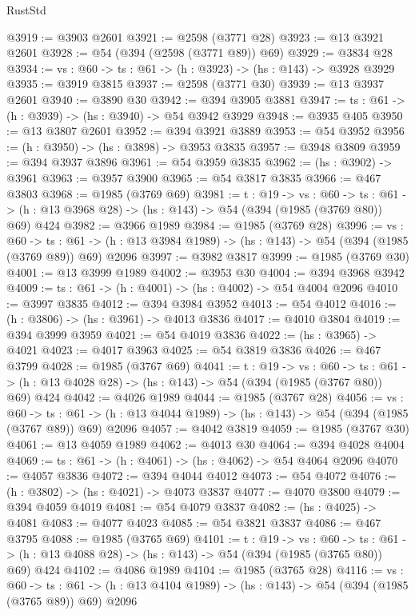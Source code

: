 \begin{lexlean}{RustStd}
\begin{coremodule}
{\begin{coremodule}
{{{{{{{{@3919 := @3903 @2601
@3921 := @2598 (@3771 @28)
@3923 := @13 @3921 @2601
@3928 := @54 (@394 (@2598 (@3771 @89)) @69)
@3929 := @3834 @28
@3934 := {vs : @60} -> {ts : @61} -> (h : @3923) -> (hs : @143) -> @3928 @3929
@3935 := @3919 @3815
@3937 := @2598 (@3771 @30)
@3939 := @13 @3937 @2601
@3940 := @3890 @30
@3942 := @394 @3905 @3881
@3947 := {ts : @61} -> (h : @3939) -> (hs : @3940) -> @54 @3942 @3929
@3948 := @3935 @405
@3950 := @13 @3807 @2601
@3952 := @394 @3921 @3889
@3953 := @54 @3952
@3956 := (h : @3950) -> (hs : @3898) -> @3953 @3835
@3957 := @3948 @3809
@3959 := @394 @3937 @3896
@3961 := @54 @3959 @3835
@3962 := (hs : @3902) -> @3961
@3963 := @3957 @3900
@3965 := @54 @3817 @3835
@3966 := @467 @3803
@3968 := @1985 (@3769 @69)
@3981 := {t : @19} ->
  {vs : @60} ->
  {ts : @61} -> (h : @13 @3968 @28) -> (hs : @143) -> @54 (@394 (@1985 (@3769 @80)) @69) @424
@3982 := @3966 @1989
@3984 := @1985 (@3769 @28)
@3996 := {vs : @60} ->
  {ts : @61} -> (h : @13 @3984 @1989) -> (hs : @143) -> @54 (@394 (@1985 (@3769 @89)) @69) @2096
@3997 := @3982 @3817
@3999 := @1985 (@3769 @30)
@4001 := @13 @3999 @1989
@4002 := @3953 @30
@4004 := @394 @3968 @3942
@4009 := {ts : @61} -> (h : @4001) -> (hs : @4002) -> @54 @4004 @2096
@4010 := @3997 @3835
@4012 := @394 @3984 @3952
@4013 := @54 @4012
@4016 := (h : @3806) -> (hs : @3961) -> @4013 @3836
@4017 := @4010 @3804
@4019 := @394 @3999 @3959
@4021 := @54 @4019 @3836
@4022 := (hs : @3965) -> @4021
@4023 := @4017 @3963
@4025 := @54 @3819 @3836
@4026 := @467 @3799
@4028 := @1985 (@3767 @69)
@4041 := {t : @19} ->
  {vs : @60} ->
  {ts : @61} -> (h : @13 @4028 @28) -> (hs : @143) -> @54 (@394 (@1985 (@3767 @80)) @69) @424
@4042 := @4026 @1989
@4044 := @1985 (@3767 @28)
@4056 := {vs : @60} ->
  {ts : @61} -> (h : @13 @4044 @1989) -> (hs : @143) -> @54 (@394 (@1985 (@3767 @89)) @69) @2096
@4057 := @4042 @3819
@4059 := @1985 (@3767 @30)
@4061 := @13 @4059 @1989
@4062 := @4013 @30
@4064 := @394 @4028 @4004
@4069 := {ts : @61} -> (h : @4061) -> (hs : @4062) -> @54 @4064 @2096
@4070 := @4057 @3836
@4072 := @394 @4044 @4012
@4073 := @54 @4072
@4076 := (h : @3802) -> (hs : @4021) -> @4073 @3837
@4077 := @4070 @3800
@4079 := @394 @4059 @4019
@4081 := @54 @4079 @3837
@4082 := (hs : @4025) -> @4081
@4083 := @4077 @4023
@4085 := @54 @3821 @3837
@4086 := @467 @3795
@4088 := @1985 (@3765 @69)
@4101 := {t : @19} ->
  {vs : @60} ->
  {ts : @61} -> (h : @13 @4088 @28) -> (hs : @143) -> @54 (@394 (@1985 (@3765 @80)) @69) @424
@4102 := @4086 @1989
@4104 := @1985 (@3765 @28)
@4116 := {vs : @60} ->
  {ts : @61} -> (h : @13 @4104 @1989) -> (hs : @143) -> @54 (@394 (@1985 (@3765 @89)) @69) @2096
}}}}}}}}
\end{coremodule}}
\end{coremodule}
\end{lexlean}

